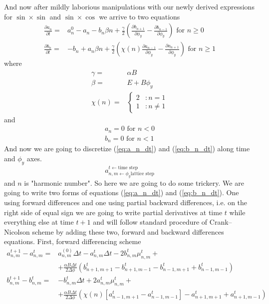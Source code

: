\documentclass[40pt,letterpaper]{article}
\begin{document}
	And now after mildly laborious manipulations with our newly derived expressions 
	for $\sin\times\sin$ and $\sin\times\cos$ we arrive to two equations
	\begin{align}
	\frac{\partial a_n}{\partial t}=& a^{0}_n -a_n-b_{n}\beta n + 
	\frac{\gamma}{2}\left(\frac{\partial b_{n+1}}{\partial\phi_y} - 
	\frac{\partial b_{n-1}}{\partial\phi_y} \right) \text{ for } n\geq 0 \label{eq:a_n_dt}\\
	\frac{\partial b_n}{\partial t}= & -b_n + a_n\beta n + 
	\frac{\gamma}{2}\left(\chi(n)\frac{\partial a_{n-1}}{\partial\phi_y} - 
	\frac{\partial a_{n+1}}{\partial\phi_y} \right) \text{ for } n\geq 1 \label{eq:b_n_dt}
	\end{align}	 
	where
	\begin{align}
	\gamma=&\alpha B \\
	\beta=&E+B\phi_y \\
	\chi(n)=&
	\begin{cases}
   2 & : n= 1 \\
   1 & : n\ne 1
  \end{cases}
	\end{align}
	and 
	\begin{align}
	a_{n}=0 \text{ for } n<0 \\	
	b_{n}=0 \text{ for } n<1
	\end{align}
	And now we are going to discretize (\ref{eq:a_n_dt}) and (\ref{eq:b_n_dt}) along time and $\phi_y$ axes.
	\begin{equation*}
	a^{\textstyle t\leftarrow\text{time step}}_{\textstyle n,m\leftarrow \phi_y \text{lattice step}}
	\end{equation*}
	and $n$ is "harmonic number". So here we are going to do some trickery. We are going to 
	write two forms of equations (\ref{eq:a_n_dt}) and (\ref{eq:b_n_dt}). One using forward
	differences and one using partial backward differences, i.e. on the right side of equal sign we are going to write partial derivatives at time $t$ while everything else at time $t+1$ and will follow standard procedure of Crank–Nicolson scheme by adding these two, 
	forward and backward differences equations. First, forward differencing scheme
	\begin{align}
	a^{t+1}_{n,m}-a^{t}_{n,m}=&a^{(0)}_{n,m}\Delta t-a^t_{n,m}\Delta t-
	2b^t_{n,m}\mu^t_{n,m}+\nonumber \\
	&+\frac{\alpha B\Delta t}{2\Delta\phi}(b^t_{n+1,m+1}-b^t_{n+1,m-1}-b^t_{n-1,m+1}+b^t_{n-1,m-1}) \label{eq:a_forward}\\
	b^{t+1}_{n,m}-b^{t}_{n,m}=&-b^t_{n,m}\Delta t+2a^{t}_{n,m}\mu^t_{n,m}+\nonumber \\
	&+\frac{\alpha B\Delta t}{2\Delta\phi}(\chi(n)[a^t_{n-1,m+1}-a^t_{n-1,m-1}]-a^t_{n+1,m+1}+a^t_{n+1,m-1}) \label{eq:b_forward}
	\end{align}
\end{document}
